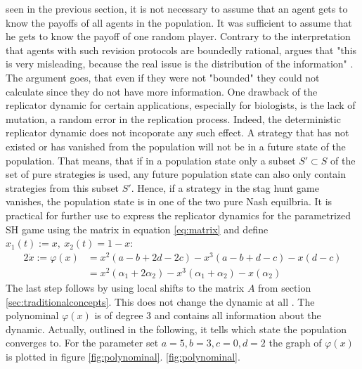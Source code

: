 \documentclass[11pt]{article}
\begin{document}
seen in the previous section, it is not necessary to assume that an agent
gets to know the payoffs of all agents in the population.
It was sufficient to assume that he gets to know the payoff of one random 
player. 
Contrary to the interpretation that agents with such revision protocols 
are boundedly rational, \textcite{gintis_game_2000}  argues 
that "this is very misleading, because the real issue is the distribution of 
the information" \parencite[273]{gints_game_2000}. 
The argument goes, that even if they were not "bounded" they 
could not calculate since they do not have more information. 
One drawback of the replicator dynamic for certain applications, especially
for biologists, is the lack of mutation, a random error in the replication 
process.
Indeed, the deterministic replicator dynamic does not incoporate 
any such effect. A strategy that has not existed or has vanished from the 
population will not be in a future state of the population. 
That means, that if in a population state only a 
subset $S' \subset S$ of the 
set of pure strategies is used, any future population state can also only 
contain strategies from this subset $S'$. Hence, if a strategy in 
the stag hunt game vanishes, the population state is in one of the two pure 
Nash equilbria. It is practical for further use to express the replicator 
dynamics for the parametrized SH game using the matrix in equation 
\eqref{eq:matrix} and define $x_1(t) := x,\ x_2(t) = 1-x$:
\begin{alignat}{2}
        \label{eq:replicatorpara}
        \dot{x} := \varphi(x) &= x^2(a-b+2d-2c) - x^3(a-b+d-c) -x(d-c) \\
                              &= x^2(\alpha_1+2\alpha_2) 
        - x^3(\alpha_1+\alpha_2) - x(\alpha_2)
\end{alignat}
The last step follows by using local shifts to the matrix $A$ from section
\ref{sec:traditionalconcepts}. This does not change the dynamic at all 
\parencite[73]{weibull_evolutionary_1997}. The polynominal $\varphi(x)$ is
of degree $3$ and contains all information about the dynamic. Actually, 
outlined in the following, it tells which state the population converges to.
For the parameter set $a=5, b=3, c=0, d=2$ the graph of $\varphi(x)$ is 
plotted in figure \ref{fig:polynominal}. 
\ref{fig:polynominal}.
\end{document}
